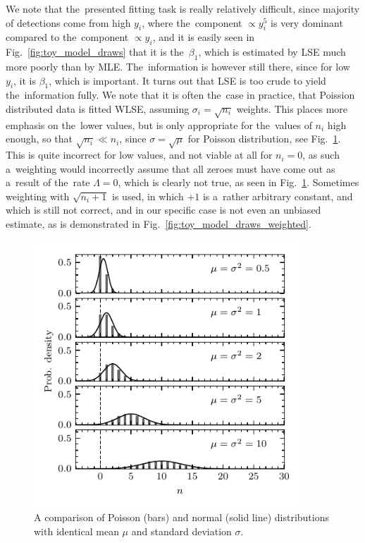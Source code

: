 We note that the~presented fitting task is really relatively difficult, since majority of detections come from high $y_i$, where the~component $\propto y_i^5$ is very dominant compared to the~component $\propto y_i$, and it is easily seen in Fig.~\ref{fig:toy_model_draws} that it is the~$\beta_1$, which is estimated by LSE much more poorly than by MLE. The~information is however still there, since for low $y_i$, it is $\beta_1$, which is important. It turns out that LSE is too crude to yield the~information fully. We note that it is often the~case in practice, that Poission distributed data is fitted WLSE, assuming $\sigma_i = \sqrt{n_i}$ weights. This places more emphasis on the~lower values, but is only appropriate for the~values of $n_i$ high enough, so that $\sqrt{n_i} \ll n_i$, since $\sigma = \sqrt{\mu}$ for Poisson distribution, see Fig.~\ref{fig:pois_vs_norm}. This is quite incorrect for low values, and not viable at all for $n_i = 0$, as such a~weighting would incorrectly assume that all zeroes must have come out as a~result of the~rate $\Lambda = 0$, which is clearly not true, as seen in Fig.~\ref{fig:pois_vs_norm}. Sometimes weighting with $\sqrt{n_i+1}$ is used, in which $+1$ is a~rather arbitrary constant, and which is still not correct, and in our specific case is not even an unbiased estimate, as is demonstrated in Fig.~\ref{fig:toy_model_draws_weighted}. 

\begin{figure}[ht]
 	\centering
 	\includegraphics[width=10cm]{figures/pois_vs_norm.pdf}
 	\caption{A comparison of Poisson (bars) and normal (solid line) distributions with identical mean $\mu$ and standard deviation $\sigma$.}
 	\label{fig:pois_vs_norm}
\end{figure}

